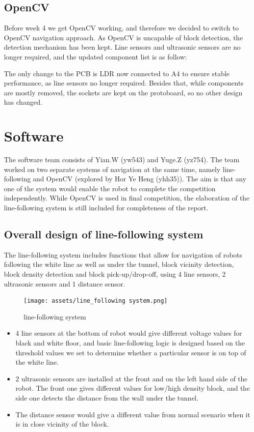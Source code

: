 \documentclass{article}
\begin{document}
\subsection{OpenCV}
\quad Before week 4 we get OpenCV working, and therefore we decided to switch to OpenCV navigation approach. As OpenCV is uncapable of block detection, the detection mechanism has been kept. Line sensors and ultrasonic sensors are no longer required, and the updated component list is as follow:

\quad The only change to the PCB is LDR now connected to A4 to ensure stable performance, as line sensors no longer required. Besides that, while components are mostly removed, the sockets are kept on the protoboard, so no other design has changed.

\section{Software}

\quad The software team consists of Yian.W (yw543) and Yuge.Z (yz754). The team worked on two separate systems of navigation at the same time, namely line-following and OpenCV (explored by Hor Ye Heng (yhh35)). The aim is that any one of the system would enable the robot to complete the competition independently. While OpenCV is used in final competition, the elaboration of the line-following system is still included for completeness of the report. 

\subsection{Overall design of line-following system}
The line-following system includes functions that allow for navigation of robots following the white line as well as under the tunnel, block vicinity detection, block density detection and block pick-up/drop-off, using 4 line sensors, 2 ultrasonic sensors and 1 distance sensor.

\begin{figure}[!h]
    \centering
    \texttt{[image: assets/line\_following system.png]}
    \caption{line-following system}
    \label{fig:line-following system}
\end{figure}

\begin{itemize}
    \item 4 line sensors at the bottom of robot would give different voltage values for black and white floor, and basic line-following logic is designed based on the threshold values we set to determine whether a particular sensor is on top of the white line.
    \item 2 ultrasonic sensors are installed at the front and on the left hand side of the robot. The front one gives different values for low/high density block, and the side one detects the distance from the wall under the tunnel.
    \item The distance sensor would give a different value from normal scenario when it is in close vicinity of the block.
\end{itemize}
\end{document}
